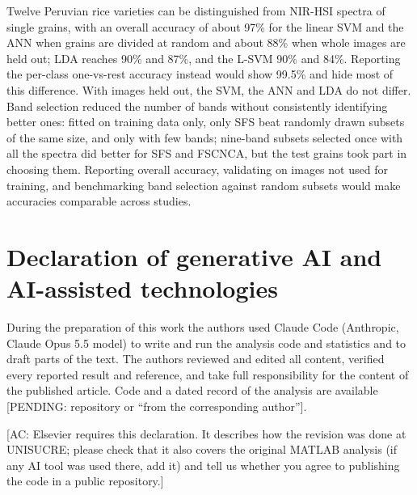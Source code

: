 \documentclass[final,5p,times,twocolumn]{elsarticle}
\newcommand{\added}[1]{{\color{blue}#1}}
\newcommand{\acnote}[1]{{\color{red}\small\textsf{[AC: #1]}}}
\begin{document}
\added{Twelve Peruvian rice varieties can be distinguished from NIR-HSI spectra of single grains, with an overall accuracy of about 97\% for the linear SVM and the ANN when grains are divided at random and about 88\% when whole images are held out; LDA reaches 90\% and 87\%, and the L-SVM 90\% and 84\%. Reporting the per-class one-vs-rest accuracy instead would show 99.5\% and hide most of this difference. With images held out, the SVM, the ANN and LDA do not differ. Band selection reduced the number of bands without consistently identifying better ones: fitted on training data only, only SFS beat randomly drawn subsets of the same size, and only with few bands; nine-band subsets selected once with all the spectra did better for SFS and FSCNCA, but the test grains took part in choosing them. Reporting overall accuracy, validating on images not used for training, and benchmarking band selection against random subsets would make accuracies comparable across studies.}



\added{\section*{Declaration of generative AI and AI-assisted technologies}
During the preparation of this work the authors used Claude Code (Anthropic, Claude Opus 5.5 model) to write and run the analysis code and statistics and to draft parts of the text. The authors reviewed and edited all content, verified every reported result and reference, and take full responsibility for the content of the published article. Code and a dated record of the analysis are available [PENDING: repository or ``from the corresponding author''].}
\acnote{Elsevier requires this declaration. It describes how the revision was done at UNISUCRE; please check that it also covers the original MATLAB analysis (if any AI tool was used there, add it) and tell us whether you agree to publishing the code in a public repository.}



\end{document}
